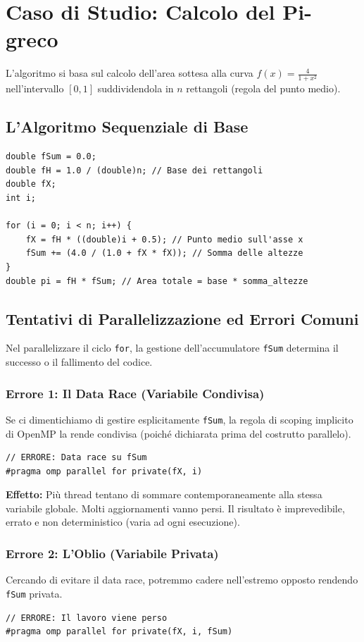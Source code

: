 \section{Caso di Studio: Calcolo del Pi-greco}

L'algoritmo si basa sul calcolo dell'area sottesa alla curva $f(x) = \frac{4}{1+x^2}$ nell'intervallo $[0, 1]$ suddividendola in $n$ rettangoli (regola del punto medio).

\subsection{L'Algoritmo Sequenziale di Base}
\begin{verbatim}
double fSum = 0.0;
double fH = 1.0 / (double)n; // Base dei rettangoli
double fX;
int i;

for (i = 0; i < n; i++) {
    fX = fH * ((double)i + 0.5); // Punto medio sull'asse x
    fSum += (4.0 / (1.0 + fX * fX)); // Somma delle altezze
}
double pi = fH * fSum; // Area totale = base * somma_altezze    
\end{verbatim}


\subsection{Tentativi di Parallelizzazione ed Errori Comuni}

Nel parallelizzare il ciclo \texttt{for}, la gestione dell'accumulatore \texttt{fSum} determina il successo o il fallimento del codice.

\subsubsection{Errore 1: Il Data Race (Variabile Condivisa)}
Se ci dimentichiamo di gestire esplicitamente \texttt{fSum}, la regola di scoping implicito di OpenMP la rende condivisa (poiché dichiarata prima del costrutto parallelo).
\begin{verbatim}
// ERRORE: Data race su fSum
#pragma omp parallel for private(fX, i)
\end{verbatim}

\textbf{Effetto:} Più thread tentano di sommare contemporaneamente alla stessa variabile globale. Molti aggiornamenti vanno persi. Il risultato è imprevedibile, errato e non deterministico (varia ad ogni esecuzione).

\subsubsection{Errore 2: L'Oblio (Variabile Privata)}
Cercando di evitare il data race, potremmo cadere nell'estremo opposto rendendo \texttt{fSum} privata.
\begin{verbatim}
// ERRORE: Il lavoro viene perso
#pragma omp parallel for private(fX, i, fSum)
\end{verbatim}

